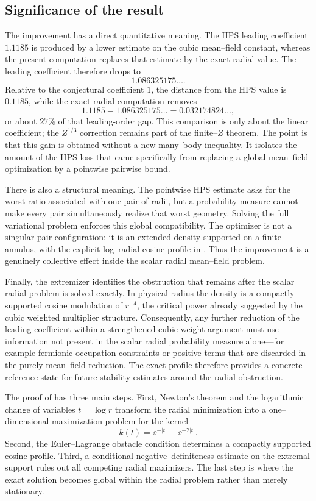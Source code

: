 \subsection*{Significance of the result}

The improvement has a direct quantitative meaning.  The HPS leading coefficient $1.1185$ is produced by a lower estimate on the cubic mean--field constant, whereas the present computation replaces that estimate by the exact radial value.  The leading coefficient therefore drops to
\[
 1.086325175\ldots .
\]
Relative to the conjectural coefficient $1$, the distance from the HPS value is $0.1185$, while the exact radial computation removes
\[
 1.1185-1.086325175\ldots=0.032174824\ldots,
\]
or about $27\%$ of that leading-order gap.  This comparison is only about the linear coefficient; the $Z^{1/3}$ correction remains part of the finite--$Z$ theorem.  The point is that this gain is obtained without a new many--body inequality.  It isolates the amount of the HPS loss that came specifically from replacing a global mean--field optimization by a pointwise pairwise bound.

There is also a structural meaning.  The pointwise HPS estimate asks for the worst ratio associated with one pair of radii, but a probability measure cannot make every pair simultaneously realize that worst geometry.  Solving the full variational problem enforces this global compatibility.  The optimizer is not a singular pair configuration: it is an extended density supported on a finite annulus, with the explicit log--radial cosine profile in .  Thus the improvement is a genuinely collective effect inside the scalar radial mean--field problem.

Finally, the extremizer identifies the obstruction that remains after the scalar radial problem is solved exactly.  In physical radius the density is a compactly supported cosine modulation of $r^{-4}$, the critical power already suggested by the cubic weighted multiplier structure.  Consequently, any further reduction of the leading coefficient within a strengthened cubic-weight argument must use information not present in the scalar radial probability measure alone---for example fermionic occupation constraints or positive terms that are discarded in the purely mean--field reduction.  The exact profile therefore provides a concrete reference state for future stability estimates around the radial obstruction.

The proof of  has three main steps.  First, Newton's theorem and the logarithmic change of variables $t=\log r$ transform the radial minimization into a one--dimensional maximization problem for the kernel
\[
 k(t)=\ee^{-|t|}-\ee^{-2|t|}.
\]
Second, the Euler--Lagrange obstacle condition determines a compactly supported cosine profile.  Third, a conditional negative--definiteness estimate on the extremal support rules out all competing radial maximizers.  The last step is where the exact solution becomes global within the radial problem rather than merely stationary.

